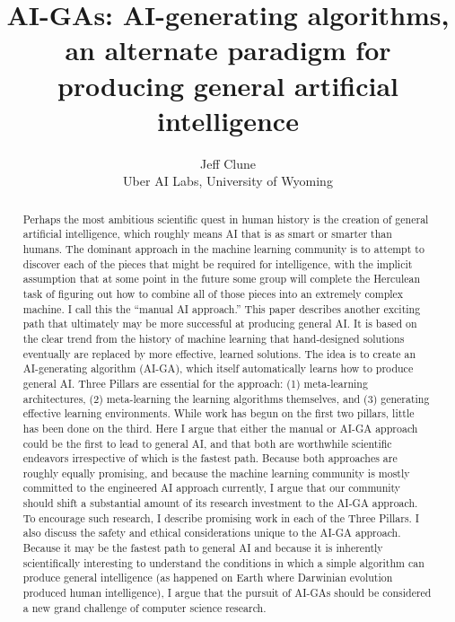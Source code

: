 \documentclass{article}
\title{AI-GAs: AI-generating algorithms, an alternate paradigm for producing general artificial intelligence}
\author{
Jeff Clune  \\
  Uber AI Labs, University of Wyoming\\
}
\begin{document}
\maketitle

\begin{abstract}
Perhaps the most ambitious scientific quest in human history is the creation of general artificial intelligence, which roughly means AI that is as smart or smarter than humans. The dominant approach in the machine learning community is to attempt to discover each of the pieces that might be required for intelligence, with the implicit assumption that at some point in the future some group will complete the Herculean task of 
figuring out how to combine all of those pieces into an extremely complex machine. I call this the ``manual AI approach.'' 
This paper describes another exciting path that ultimately may be more successful at producing general AI. It is based on the clear trend from the history of machine learning that hand-designed solutions eventually are replaced by more effective, learned solutions. The idea is to create an AI-generating algorithm (AI-GA), which itself automatically learns how to produce general AI. Three Pillars are essential for the approach: (1) meta-learning architectures, (2) meta-learning the learning algorithms themselves, and (3) generating effective learning environments. While work has begun on the first two pillars, little has been done on the third. Here I argue that either the manual or AI-GA approach could be the first to lead to general AI, and that both are worthwhile scientific endeavors irrespective of which is the fastest path. Because both approaches are roughly equally promising, and because the machine learning community is mostly committed to the engineered AI approach currently, I argue that our community should shift a substantial amount of its research investment to the AI-GA approach. To encourage such research, I describe promising work in each of the Three Pillars. I also discuss the safety and ethical considerations unique to the AI-GA approach. Because it may be the fastest path to general AI and because it is inherently scientifically interesting to understand the conditions in which a simple algorithm can produce general intelligence (as happened on Earth where Darwinian evolution produced human intelligence), I argue that the pursuit of AI-GAs should be considered a new grand challenge of computer science research. 

\end{abstract}
\end{document}
